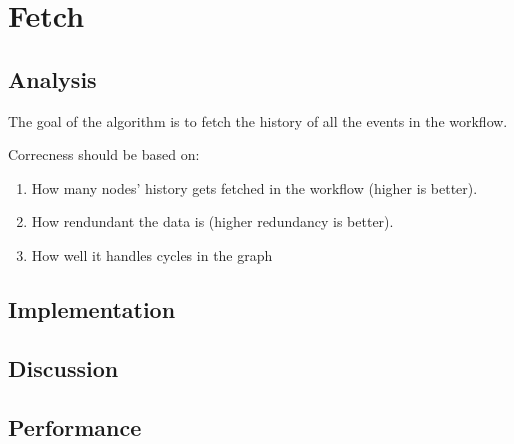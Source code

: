 \section{Fetch}
\subsection{Analysis} %
The goal of the algorithm is to fetch the history of all the events in the workflow.

Correcness should be based on:
\begin{enumerate}
    \item How many nodes' history gets fetched in the workflow (higher is better).
    \item How rendundant the data is (higher redundancy is better).
    \item How well it handles cycles in the graph
\end{enumerate}

\subsection{Implementation} %
\subsection{Discussion} %
\subsection{Performance} %